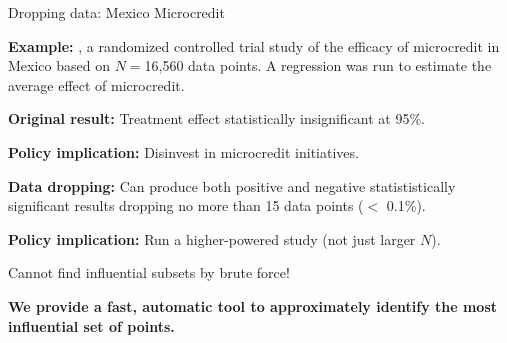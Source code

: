 \begin{frame}[t]{Dropping data: Mexico Microcredit}


\vspace{1em} \textbf{Example:} \citet{angelucci2015microcredit}, a randomized
controlled trial study of the efficacy of microcredit in Mexico based on $N =
$16,560 data points. A regression was run to estimate the average effect of
microcredit.

\hrulefill

\vspace{1em}
\textbf{Original result: }
Treatment effect statistically insignificant at 95\%.


\vspace{1em}
\textbf{Policy implication: } Disinvest in microcredit initiatives.

\hrulefill

\vspace{1em} \textbf{Data dropping: } Can produce both positive and negative
statististically significant results dropping no more than 15 data points
($<$ 0.1\%).

\vspace{1em}
\textbf{Policy implication: } Run a higher-powered study (not just
larger $N$).

\hrulefill

Cannot find influential subsets by brute force!

\vspace{1em}
\textbf{We provide a fast, automatic tool to  approximately identify the
most influential set of points.}


\end{frame}


